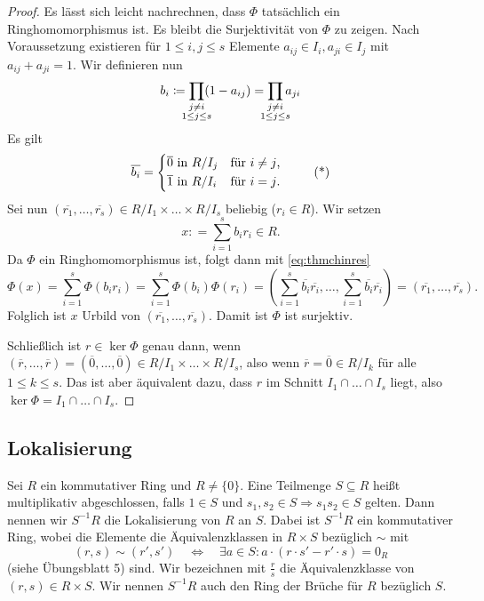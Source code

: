 \documentclass[12pt,a4paper]{scrartcl}
\begin{document}
\begin{proof}
	Es lässt sich leicht nachrechnen, dass $\Phi$ tatsächlich ein Ringhomomorphismus ist. Es bleibt die Surjektivität von $\Phi$ zu zeigen. Nach Voraussetzung existieren für $1\leq i,j\leq s$ Elemente $a_{ij}\in I_i, a_{ji}\in I_j$ mit $a_{ij}+a_{ji} = 1$. Wir definieren nun
	\[b_i \coloneqq \prod_{\mathclap{\substack{j\neq i\\1\leq j\leq s}}} (1-a_{ij}) = \prod_{\mathclap{\substack{j\neq i\\1\leq j\leq s}}} a_{ji}\]
	Es gilt
	\begin{equation}
	\overline{b_i} = \begin{cases*} \text{$\overline{0}$ in $R/I_j$} & für $i\neq j$,\\
	\text{$\overline{1}$ in $R/I_i$} & für $i=j$.
	\end{cases*} \tag{*}\label{eq:thmchinres}
	\end{equation}
	Sei nun $(\overline{r_1},\dots, \overline{r_s})\in R/I_1\times \dots \times R/I_s$ beliebig ($r_i\in R$). Wir setzen
	\[ x : = \sum_{i = 1}^{s} b_ir_i\in R.\]
	Da $\Phi$ ein Ringhomomorphismus ist, folgt dann mit \eqref{eq:thmchinres} \[
	\Phi(x) = \sum_{i=1}^{s}\Phi(b_ir_i) = \sum_{i=1}^{s}\Phi(b_i)\Phi(r_i) = \left(\sum_{i =1}^{s}\overline{b_i}\overline{r_i},\dots, \sum_{i = 1}^{s}\overline{b_i}\overline{r_i}\right) = (\overline{r_1},\dots, \overline{r_s})
	.\]
	Folglich ist $x$ Urbild von $(\overline{r_1},\dots, \overline{r_s})$. Damit ist $\Phi$ ist surjektiv.
	
	Schließlich ist $r\in \ker\Phi$ genau dann, wenn $(\overline{r},\dots, \overline{r}) = (\overline{0},\dots, \overline{0})\in R/I_1\times\dots\times R/I_s$, also wenn $\overline{r} = \overline{0}\in R/I_k$ für alle $1\leq k\leq s$. Das ist aber äquivalent dazu, dass $r$ im Schnitt $I_1\cap\dots\cap I_s$ liegt, also $\ker\Phi = I_1\cap\dots\cap I_s$.
\end{proof}


\subsection{Lokalisierung}
\begin{defi} Sei $R$ ein kommutativer Ring und $R\neq \{0\}$. Eine Teilmenge $S\subseteq R$ heißt multiplikativ abgeschlossen, falls $1\in S$ und $s_1,s_2\in S\Rightarrow s_1s_2\in S$ gelten. Dann nennen wir $S^{-1}R$ die Lokalisierung von $R$ an $S$. Dabei ist $S^{-1}R$ ein kommutativer Ring, wobei die Elemente die Äquivalenzklassen in $R\times S$ bezüglich $\sim$ mit
	\begin{equation*}
	(r, s) \sim (r', s') \quad \Longleftrightarrow \quad \exists a \in S \colon a \cdot (r \cdot s' - r' \cdot s) = 0_R
	\end{equation*}
	(siehe Übungsblatt 5) sind.
	Wir bezeichnen mit $\frac rs$ die Äquivalenzklasse von $(r,s)\in R\times S$. Wir nennen $S^{-1}R$ auch den Ring der Brüche für $R$ bezüglich $S$.
\end{defi}
\end{document}
